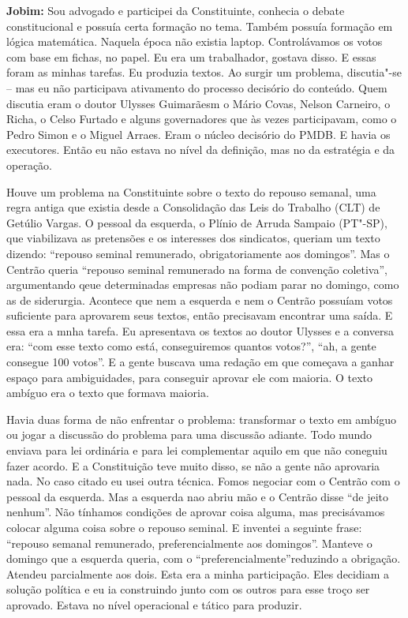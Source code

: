 \textbf{Jobim:} Sou advogado e participei da Constituinte, conhecia o
debate constitucional e possuía certa formação no tema. Também possuía
formação em lógica matemática. Naquela época não existia laptop.
Controlávamos os votos com base em fichas, no papel. Eu era um
trabalhador, gostava disso. E essas foram as minhas tarefas. Eu produzia
textos. Ao surgir um problema, discutia"-se -- mas eu não participava
ativamento do processo decisório do conteúdo. Quem discutia eram o
doutor Ulysses Guimarãesm o Mário Covas, Nelson Carneiro, o Richa, o
Celso Furtado e alguns governadores que às vezes participavam, como o
Pedro Simon e o Miguel Arraes. Eram o núcleo decisório do PMDB. E havia
os executores. Então eu não estava no nível da definição, mas no da
estratégia e da operação.

Houve um problema na Constituinte sobre o texto do repouso semanal, uma
regra antiga que existia desde a Consolidação das Leis do Trabalho (CLT)
de Getúlio Vargas. O pessoal da esquerda, o Plínio de Arruda Sampaio
(PT"-SP), que viabilizava as pretensões e os interesses dos sindicatos,
queriam um texto dizendo: ``repouso seminal remunerado, obrigatoriamente
aos domingos''. Mas o Centrão queria ``repouso seminal remunerado na
forma de convenção coletiva'', argumentando qeue determinadas empresas
não podiam parar no domingo, como as de siderurgia. Acontece que nem a
esquerda e nem o Centrão possuíam votos suficiente para aprovarem seus
textos, então precisavam encontrar uma saída. E essa era a mnha tarefa.
Eu apresentava os textos ao doutor Ulysses e a conversa era: ``com esse
texto como está, conseguiremos quantos votos?'', ``ah, a gente consegue
100 votos''. E a gente buscava uma redação em que começava a ganhar
espaço para ambiguidades, para conseguir aprovar ele com maioria. O
texto ambíguo era o texto que formava maioria.

Havia duas forma de não enfrentar o problema: transformar o texto em
ambíguo ou jogar a discussão do problema para uma discussão adiante.
Todo mundo enviava para lei ordinária e para lei complementar aquilo em
que não coneguiu fazer acordo. E a Constituição teve muito disso, se não
a gente não aprovaria nada. No caso citado eu usei outra técnica. Fomos
negociar com o Centrão com o pessoal da esquerda. Mas a esquerda nao
abriu mão e o Centrão disse ``de jeito nenhum''. Não tínhamos condições
de aprovar coisa alguma, mas precisávamos colocar alguma coisa sobre o
repouso seminal. E inventei a seguinte frase: ``repouso semanal
remunerado, preferencialmente aos domingos''. Manteve o domingo que a
esquerda queria, com o ``preferencialmente''reduzindo a obrigação.
Atendeu parcialmente aos dois. Esta era a minha participação. Eles
decidiam a solução política e eu ia construindo junto com os outros para
esse troço ser aprovado. Estava no nível operacional e tático para
produzir.

